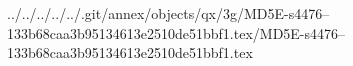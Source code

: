 ../../../../../.git/annex/objects/qx/3g/MD5E-s4476--133b68caa3b95134613e2510de51bbf1.tex/MD5E-s4476--133b68caa3b95134613e2510de51bbf1.tex